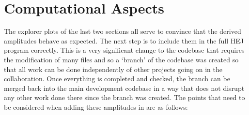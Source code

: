 \section{Computational Aspects}
The explorer plots of the last two sections all serve to convince that the derived amplitudes behave as expected. The next step is to include them in the full HEJ program correctly. This is a very significant change to the codebase that requires the modification of many files and so a `branch' of the codebase was created so that all work can be done independently of other projects going on in the collaboration. Once everything is completed and checked, the branch can be merged back into the main development codebase in a way that does not disrupt any other work done there since the branch was created. The points that need to be considered when adding these amplitudes in are as follows:


